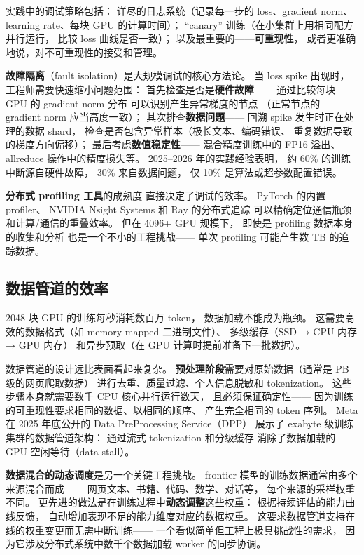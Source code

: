 实践中的调试策略包括：
详尽的日志系统（记录每一步的 loss、gradient norm、
learning rate、每块 GPU 的计算时间）；
``canary'' 训练（在小集群上用相同配方并行运行，
比较 loss 曲线是否一致）；
以及最重要的——\textbf{可重现性}，
或者更准确地说，对不可重现性的接受和管理。

\textbf{故障隔离}（fault isolation）是大规模调试的核心方法论。
当 loss spike 出现时，
工程师需要快速缩小问题范围：
首先检查是否是\textbf{硬件故障}——
通过比较每块 GPU 的 gradient norm 分布
可以识别产生异常梯度的节点
（正常节点的 gradient norm 应当高度一致）；
其次排查\textbf{数据问题}——
回溯 spike 发生时正在处理的数据 shard，
检查是否包含异常样本（极长文本、编码错误、
重复数据导致的梯度方向偏移）；
最后考虑\textbf{数值稳定性}——
混合精度训练中的 FP16 溢出、
allreduce 操作中的精度损失等。
2025--2026 年的实践经验表明，
约 60\% 的训练中断源自硬件故障，
30\% 来自数据问题，
仅 10\% 是算法或超参数配置错误。

\textbf{分布式 profiling 工具}的成熟度
直接决定了调试的效率。
PyTorch 的内置 profiler、
NVIDIA Nsight Systems 和 Ray 的分布式追踪
可以精确定位通信瓶颈和计算/通信的重叠效率。
但在 4096+ GPU 规模下，
即使是 profiling 数据本身的收集和分析
也是一个不小的工程挑战——
单次 profiling 可能产生数 TB 的追踪数据。

\subsection{数据管道的效率}

2048 块 GPU 的训练每秒消耗数百万 token，
数据加载不能成为瓶颈。
这需要高效的数据格式（如 memory-mapped 二进制文件）、
多级缓存（SSD → CPU 内存 → GPU 内存）
和异步预取（在 GPU 计算时提前准备下一批数据）。

数据管道的设计远比表面看起来复杂。
\textbf{预处理阶段}需要对原始数据（通常是 PB 级的网页爬取数据）
进行去重、质量过滤、个人信息脱敏和 tokenization。
这些步骤本身就需要数千 CPU 核心并行运行数天，
且必须保证确定性——
因为训练的可重现性要求相同的数据、以相同的顺序、
产生完全相同的 token 序列。
Meta 在 2025 年底公开的 Data PreProcessing Service（DPP）
展示了 exabyte 级训练集群的数据管道架构：
通过流式 tokenization 和分级缓存
消除了数据加载的 GPU 空闲等待（data stall）。

\textbf{数据混合的动态调度}是另一个关键工程挑战。
frontier 模型的训练数据通常由多个来源混合而成——
网页文本、书籍、代码、数学、对话等，
每个来源的采样权重不同。
更先进的做法是在训练过程中\textbf{动态调整}这些权重：
根据持续评估的能力曲线反馈，
自动增加表现不足的能力维度对应的数据权重。
这要求数据管道支持在线的权重变更而无需中断训练——
一个看似简单但工程上极具挑战性的需求，
因为它涉及分布式系统中数千个数据加载 worker 的同步协调。

